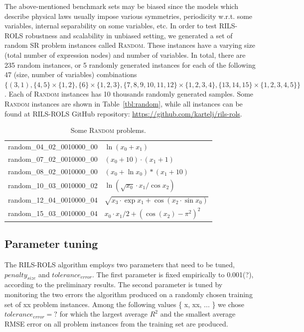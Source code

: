 \documentclass[a4paper,12pt]{elsarticle}
\begin{document}
The above-mentioned benchmark sets may be biased since the models which describe physical laws usually impose   various symmetries, periodicity w.r.t. some variables, internal separability on some variables, etc. In order to test \textsc{RILS-ROLS} robustness and scalability in unbiased setting, we generated a set of random SR problem instances called \textsc{Random}. These instances have a varying size (total number of expression nodes) and number of variables. In total, there are 235 random instances, or 5 randomly generated instances for each of the following 47 (size, number of variables) combinations $\{(3, 1), \{4, 5\} \times \{1, 2\}, \{6\} \times \{1, 2, 3\}, \{7, 8, 9, 10, 11, 12\} \times \{1, 2, 3, 4\}, \{13, 14, 15\} \times \{1, 2, 3, 4, 5\}\}$. Each of \textsc{Random} instances has 10 thousands randomly generated samples. 
Some \textsc{Random} instances are shown in Table~\ref{tbl:random}, while all instances can be found at \textsc{RILS-ROLS} GitHub repository: \url{https://github.com/kartelj/rils-rols}. 

	\begin{table}
	\centering
	\begin{tabular}{ll} \\ \hline
		random\_04\_02\_0010000\_00 &	$\ln{(x_0 + x_1)}$\\
		random\_07\_02\_0010000\_00 &	$(x_0 + 10)\cdot (x_1 + 1)$\\
		random\_08\_02\_0010000\_00 &	$(x_0 + \ln{x_0})*(x_1 + 10)$\\
		random\_10\_03\_0010000\_02 &	$\ln{(\sqrt{x_0} \cdot x_1/\cos{x_2})}$\\
		random\_12\_04\_0010000\_04 &	$\sqrt{x_3 \cdot \exp{x_1} + \cos{(x_2 \cdot \sin{x_0})}}$\\
		random\_15\_03\_0010000\_04	&   $x_0 \cdot x_1/2 + (\cos{(x_2)} - \pi^2)^2$\\
		\hline
	\end{tabular}
	\caption{Some \textsc{Random} problems.}
	\label{table:random}
\end{table}

\subsection{Parameter tuning}
The \textsc{RILS}-\textsc{ROLS} algorithm employs two parameters that need to be tuned, $penalty_{size}$ and $tolerance_{error}$. The first parameter is fixed empirically to 0.001(?), according to the preliminary results.  The second parameter is tuned by monitoring the two errors the algorithm produced on a randomly chosen training set of xx problem instances. Among the following values \{ x, xx, ... \} we chose $tolerance_{error}=?$ for which the largest average $R^2$ and the smallest average RMSE error on all problem instances from the training set are produced. %
\end{document}
